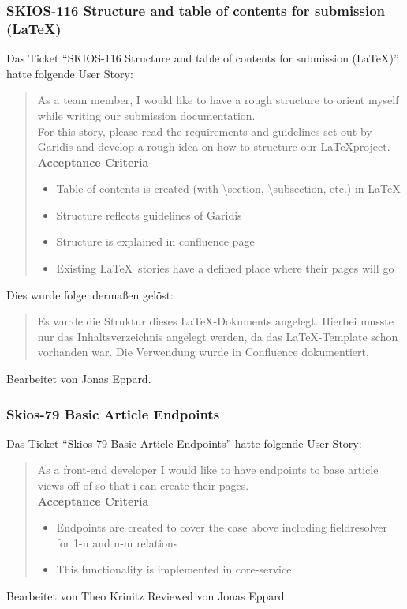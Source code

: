 \subsubsection{SKIOS-116 Structure and table of contents for submission (\LaTeX)}
Das Ticket \enquote{SKIOS-116 Structure and table of contents for submission (\LaTeX)}
hatte folgende User Story:
\begin{quotation}
    As a team member, I would like to have a rough structure to orient myself while writing our submission documentation.\\
    For this story, please read the requirements and guidelines set out by Garidis and develop a rough idea on how to structure our \LaTeX project.\\
    \textbf{Acceptance Criteria}
    \begin{itemize}
        \item Table of contents is created (with \textbackslash{}section, \textbackslash{}subsection, etc.) in \LaTeX
        \item Structure reflects guidelines of Garidis
        \item Structure is explained in confluence page
        \item Existing \LaTeX~stories have a defined place where their pages will go
    \end{itemize}
\end{quotation}
Dies wurde folgendermaßen gelöst:
\begin{quotation}
    Es wurde die Struktur dieses \LaTeX-Dokuments angelegt. Hierbei musste nur das Inhaltsverzeichnis
    angelegt werden, da das \LaTeX-Template schon vorhanden war.
    Die Verwendung wurde in Confluence dokumentiert.
\end{quotation}
Bearbeitet von Jonas Eppard.

\subsubsection{Skios-79 Basic Article Endpoints}
Das Ticket \enquote{Skios-79 Basic Article Endpoints} hatte folgende User Story:
\begin{quotation}
    As a front-end developer I would like to have endpoints to base article views off of so that i can create their pages.\\
    \textbf{Acceptance Criteria}
    \begin{itemize}
        \item Endpoints are created to cover the case above including fieldresolver for 1-n and n-m relations
        \item This functionality is implemented in core-service
    \end{itemize}
\end{quotation}
Bearbeitet von Theo Krinitz
Reviewed von Jonas Eppard

